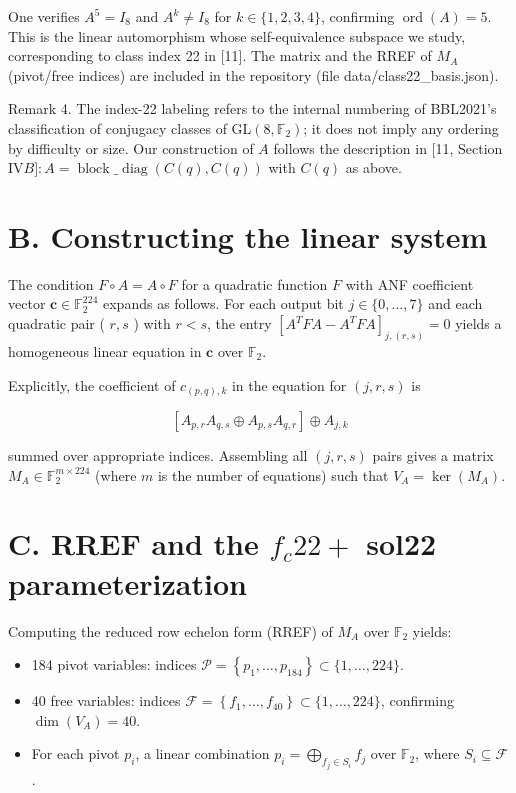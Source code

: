 \documentclass[10pt]{article}
\begin{document}
One verifies $A^{5}=I_{8}$ and $A^{k} \neq I_{8}$ for $k \in\{1,2,3,4\}$, confirming $\operatorname{ord}(A)=5$. This is the linear automorphism whose self-equivalence subspace we study, corresponding to class index 22 in [11]. The matrix and the RREF of $M_{A}$ (pivot/free indices) are included in the repository (file data/class22\_basis.json).

Remark 4. The index-22 labeling refers to the internal numbering of BBL2021's classification of conjugacy classes of $\mathrm{GL}\left(8, \mathbb{F}_{2}\right)$; it does not imply any ordering by difficulty or size. Our construction of $A$ follows the description in [11, Section IV$B]: A=\operatorname{block} \_\operatorname{diag}(C(q), C(q))$ with $C(q)$ as above.

\section*{B. Constructing the linear system}
The condition $F \circ A=A \circ F$ for a quadratic function $F$ with ANF coefficient vector $\mathbf{c} \in \mathbb{F}_{2}^{224}$ expands as follows. For each output bit $j \in\{0, \ldots, 7\}$ and each quadratic pair ( $r, s$ ) with $r<s$, the entry $\left[A^{T} F A-A^{T} F A\right]_{j,(r, s)}=0$ yields a homogeneous linear equation in $\mathbf{c}$ over $\mathbb{F}_{2}$.

Explicitly, the coefficient of $c_{(p, q), k}$ in the equation for $(j, r, s)$ is


\begin{equation*}
\left[A_{p, r} A_{q, s} \oplus A_{p, s} A_{q, r}\right] \oplus A_{j, k} \tag{2}
\end{equation*}


summed over appropriate indices. Assembling all $(j, r, s)$ pairs gives a matrix $M_{A} \in \mathbb{F}_{2}^{m \times 224}$ (where $m$ is the number of equations) such that $V_{A}=\operatorname{ker}\left(M_{A}\right)$.

\section*{C. RREF and the $f_{c} 22+$ sol22 parameterization}
Computing the reduced row echelon form (RREF) of $M_{A}$ over $\mathbb{F}_{2}$ yields:

\begin{itemize}
  \item 184 pivot variables: indices $\mathcal{P}=\left\{p_{1}, \ldots, p_{184}\right\} \subset\{1, \ldots, 224\}$.
  \item 40 free variables: indices $\mathcal{F}=\left\{f_{1}, \ldots, f_{40}\right\} \subset\{1, \ldots, 224\}$, confirming $\operatorname{dim}\left(V_{A}\right)=40$.
  \item For each pivot $p_{i}$, a linear combination $p_{i}=\bigoplus_{f_{j} \in S_{i}} f_{j}$ over $\mathbb{F}_{2}$, where $S_{i} \subseteq \mathcal{F}$.
\end{itemize}
\end{document}
